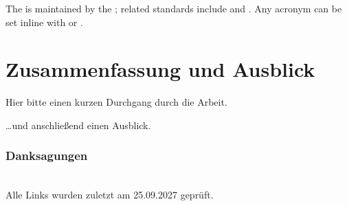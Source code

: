 \begin{ltgexample}
The \UML is maintained by the \OMG; related standards include \BPEL and \BPMN.
Any acronym can be set inline with  or .
\end{ltgexample}


\section{Zusammenfassung und Ausblick}
\label{sec:outlook}
Hier bitte einen kurzen Durchgang durch die Arbeit.

\lipsum[1-2]

\ldots und anschließend einen Ausblick.

\subsubsection*{Danksagungen}



\renewcommand{\bibsection}{\section*{Literatur}} %

\begingroup
  \small %
  
\endgroup

\ \\
%
\noindent
Alle Links wurden zuletzt am 25.09.2027 geprüft.




